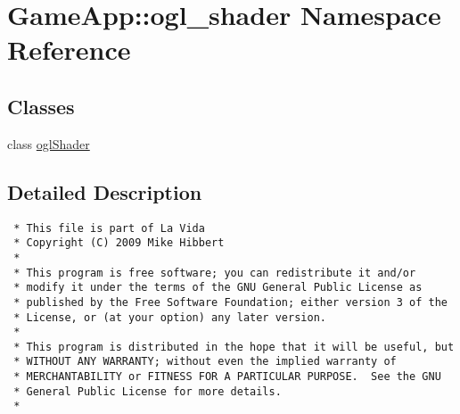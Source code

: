 \hypertarget{namespaceGameApp_1_1ogl__shader}{
\section{GameApp::ogl\_\-shader Namespace Reference}
\label{namespaceGameApp_1_1ogl__shader}
}


\subsection*{Classes}
\begin{CompactItemize}
\item 
class \hyperlink{classGameApp_1_1ogl__shader_1_1oglShader}{oglShader}
\end{CompactItemize}


\subsection{Detailed Description}


\footnotesize\begin{verbatim}
 * This file is part of La Vida
 * Copyright (C) 2009 Mike Hibbert
 *
 * This program is free software; you can redistribute it and/or
 * modify it under the terms of the GNU General Public License as
 * published by the Free Software Foundation; either version 3 of the
 * License, or (at your option) any later version.
 *
 * This program is distributed in the hope that it will be useful, but
 * WITHOUT ANY WARRANTY; without even the implied warranty of
 * MERCHANTABILITY or FITNESS FOR A PARTICULAR PURPOSE.  See the GNU
 * General Public License for more details.
 *
\end{verbatim}
\normalsize
 